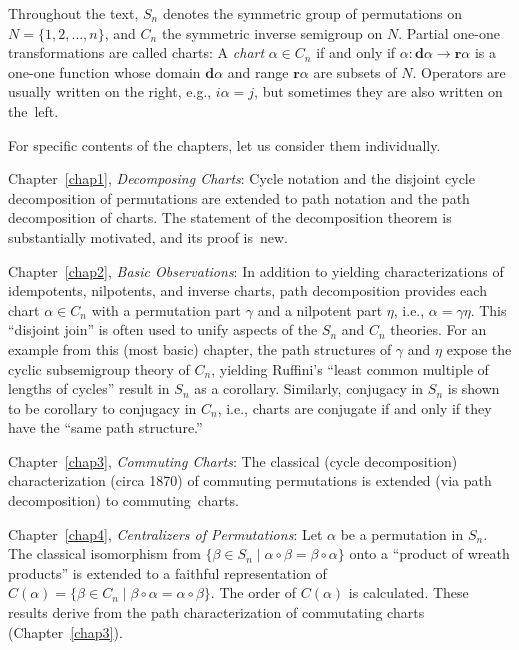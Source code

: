 \documentclass{surv-l}
\numberwithin{equation}{section}
\numberwithin{table}{section}
\numberwithin{figure}{section}
\theoremstyle{plain}
\theoremstyle{definition}
\begin{document}
Throughout the text, $S_{n}$ denotes the symmetric group of
permutations on $N=\{1,2,\ldots, n\}$, and $C_{n}$ the symmetric
inverse semigroup on $N$. Partial one-one transformations are called
charts: A \emph{chart} $\alpha\in C_{n}$ if and only if $\alpha :
\mathbf{d}\alpha\rightarrow \mathbf{r}\alpha$ is a one-one
function whose domain $\mathbf{d}\alpha$ and range
$\mathbf{r}\alpha$ are subsets of $N$. Operators are usually
written on the right, e.g., $i\alpha=j$, but sometimes they are
also written on the~left.

For specific contents of the chapters, let us consider them individually.

Chapter~\ref{chap1}, \emph{Decomposing Charts}: Cycle notation and
the disjoint cycle decomposition of permutations are extended to
path notation and the path decomposition of charts. The statement
of the decomposition theorem is substantially motivated, and its
proof is~new.

Chapter~\ref{chap2}, \emph{Basic Observations}: In addition to
yielding characterizations of idempotents, nilpotents, and inverse
charts, path decomposition provides each chart $\alpha\in C_{n}$
with a permutation part $\gamma$ and a nilpotent part $\eta$,
i.e., $\alpha=\gamma\eta$. This ``disjoint join'' is often used to
unify aspects of the $S_{n}$ and $C_{n}$ theories. For an example
from this (most basic) chapter, the path structures of $\gamma$
and $\eta$ expose the cyclic subsemigroup theory of $C_{n}$,
yielding Ruffini's ``least common multiple of lengths of cycles''
result in $S_{n}$ as a corollary. Similarly, conjugacy in $S_{n}$
is shown to be corollary to conjugacy in $C_{n}$, i.e., charts are
conjugate if and only if they have the ``same path structure.''

Chapter~\ref{chap3}, \emph{Commuting Charts}: The classical (cycle
decomposition) characterization (circa 1870) of commuting
permutations is extended (via path decomposition) to
commuting~charts.

Chapter~\ref{chap4}, \emph{Centralizers of
Permutations}: Let $\alpha$ be a permutation
in $S_{n}$. The classical isomorphism from $\{\beta\in
S_{n}\mid \alpha \circ \beta=\beta \circ \alpha\}$ onto a
``product of wreath products'' is extended
to a faithful representation of $C(\alpha)=\{\beta\in
C_{n}\mid \beta \circ \alpha=\alpha \circ \beta\}$. The order
of $C(\alpha)$ is calculated. These results derive from the path
characterization of commutating charts (Chapter~\ref{chap3}).
\end{document}

